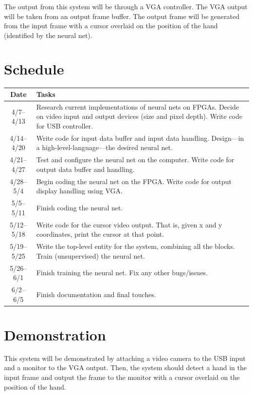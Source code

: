 \documentclass[12pt]{article}
\begin{document}
The output from this system will be through a VGA controller. The VGA output
will be taken from an output frame buffer. The output frame will be generated
from the input frame with a cursor overlaid on the position of the hand
(identified by the neural net).

\section{Schedule}
\label{sec:schedule}

\setlength\extrarowheight{3pt}
\begin{tabularx}{\textwidth}{c X}
    Date & Tasks \\
    \midrule
    4/7--4/13 & Research current implementations of neural nets on FPGAs. Decide
    on video input and output devices (size and pixel depth). Write code for USB
    controller. \\
    4/14--4/20 & Write code for input data buffer and input data handling.
    Design---in a high-level-language---the desired neural net. \\
    4/21--4/27 & Test and configure the neural net on the computer. Write code
    for output data buffer and handling. \\
    4/28--5/4 & Begin coding the neural net on the FPGA\@. Write code for output
    display handling using VGA\@. \\
    5/5--5/11 & Finish coding the neural net. \\
    5/12--5/18 & Write code for the cursor video output. That is, given x and y
    coordinates, print the cursor at that point. \\
    5/19--5/25 & Write the top-level entity for the system, combining all the
    blocks. Train (unsupervised) the neural net. \\
    5/26--6/1 & Finish training the neural net. Fix any other bugs/issues. \\
    6/2--6/5 & Finish documentation and final touches.
\end{tabularx}

\section{Demonstration}
\label{sec:demonstration}

This system will be demonstrated by attaching a video camera to the USB input
and a monitor to the VGA output. Then, the system should detect a hand in the
input frame and output the frame to the monitor with a cursor overlaid on the
position of the hand.
\end{document}
